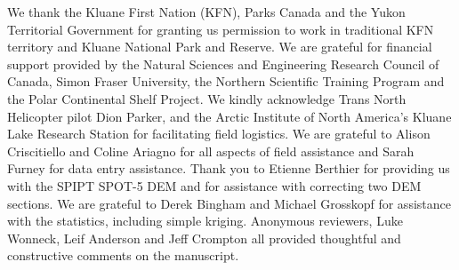 \documentclass[review,oneside, letterpaper]{igs}
\begin{document}
We thank the Kluane First Nation (KFN), Parks Canada and the Yukon Territorial Government for granting us permission to work in traditional KFN territory and Kluane National Park and Reserve. We are grateful for financial support provided by the Natural Sciences and Engineering Research Council of  Canada, Simon Fraser University, the Northern Scientific  Training  Program and the Polar Continental Shelf Project. We kindly acknowledge Trans North Helicopter pilot Dion Parker, and the Arctic Institute of North America's Kluane Lake Research Station for facilitating field logistics. We are grateful to Alison Criscitiello and Coline Ariagno for all aspects of field assistance and Sarah Furney for data entry assistance. Thank you to Etienne Berthier for providing us with the SPIPT SPOT-5 DEM and for assistance with correcting two DEM sections. We are grateful to Derek Bingham and Michael Grosskopf for assistance with the statistics, including simple kriging. Anonymous reviewers, Luke Wonneck, Leif Anderson and Jeff Crompton all provided
thoughtful and constructive comments on the
manuscript.


%

%


\end{document}
